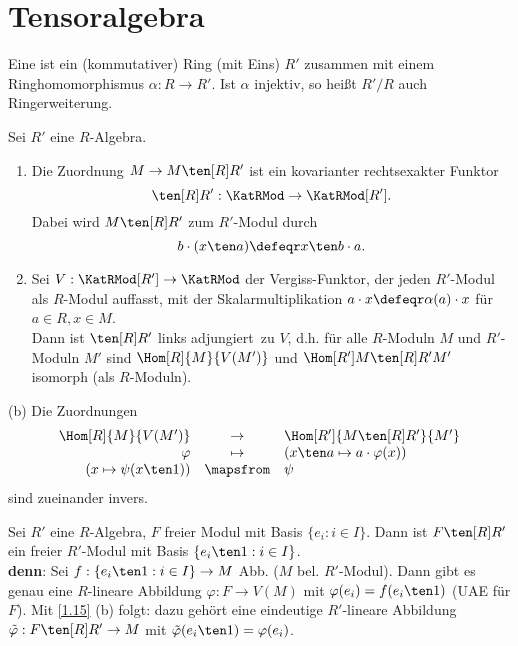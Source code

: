 \section{Tensoralgebra}

\begin{Def}
\label{1.14}
Eine  ist ein (kommutativer) Ring (mit Eins) $R'$
zusammen mit einem Ringhomomorphismus $\alpha: R\to R'$.
Ist $\alpha$ injektiv, so hei\ss t $R'/R$ auch Ringerweiterung.
\end{Def}

\begin{Bem}
\label{1.15}
Sei $R'$ eine $R$-Algebra.
\begin{enumerate}
\item Die Zuordnung $M\to M\ten[R] R'$ ist ein kovarianter rechtsexakter Funktor
\[
\ten[R] R':\KatRMod\to \KatRMod[R'].
\]
Dabei wird $M\ten[R] R'$ zum $R'$-Modul durch
\[
b\cdot (x\ten a)\defeqr x\ten b\cdot a.
\]
\item Sei $V: \KatRMod[R']\to \KatRMod$ der \glqq Vergiss-Funktor\grqq, der
jeden $R'$-Modul als 
$R$-Modul auffasst, mit der Skalarmultiplikation $a\cdot x\defeqr\alpha(a)\cdot x$
f\"ur $a\in R, x\in M$.\\
Dann ist $\ten[R] R'$ \glqq links adjungiert\grqq\ zu $V$, d.h. f\"ur alle 
$R$-Moduln $M$ und $R'$-Moduln $M'$ sind $\Hom[R]{M}{V(M')}$ und 
$\Hom[{R'}]{M\ten[R] R'}{M'}$ isomorph (als $R$-Moduln).
\end{enumerate}
\end{Bem}

\begin{Bew}
\item[(b)] Die Zuordnungen $$\begin{array}{rcl}
\Hom[R]{M}{V(M')} & \to & \Hom[R']{M\ten[R] R'}{M'}\\
\varphi & \mapsto & (x\ten a\mapsto a\cdot \varphi(x))\\
(x\mapsto \psi(x\ten 1))&\mapsfrom & \psi \\
\end{array}$$
sind zueinander invers.
\end{Bew}

\begin{nnBsp}
Sei $R'$ eine $R$-Algebra, $F$ freier Modul mit Basis $\{e_i:i\in I\}$. Dann ist $F\ten[R] R'$ ein freier
$R'$-Modul mit Basis $\{e_i\ten 1:i\in I\}$.\\
\textbf{denn}: Sei $f:\{e_i\ten 1: i\in I\} \to M$ Abb. ($M$ bel. $R'$-Modul).
Dann gibt es genau eine $R$-lineare Abbildung $\varphi: F\to V(M)$ mit $\varphi(e_i)=f(e_i\ten 1)$ (UAE f\"ur $F$).
Mit \ref{1.15} (b) folgt: dazu geh\"ort eine eindeutige $R'$-lineare Abbildung
$\tilde\varphi: F\ten[R] R'\to M$ mit $\tilde\varphi(e_i\ten 1)=\varphi(e_i)$.
\end{nnBsp}

